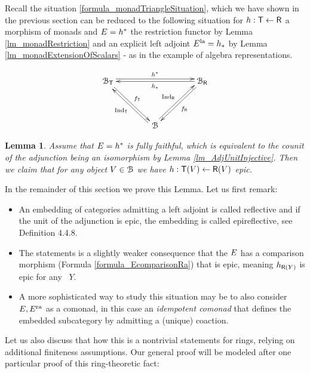 \documentclass[a4paper, reqno]{amsart}
\newtheorem{lemma}[theorem]{Lemma}
\theoremstyle{introTheorems}
\renewcommand{\1}{\mathbbold{1}}
\begin{document}
Recall the situation \eqref{formula_monadTriangleSituation}, which we have shown in the previous section can be reduced to the following situation for $h:{\mathsf{T}}\leftarrow {\mathsf{R}}$ a morphism of monads and $E=h^*$ the restriction functor by Lemma \ref{lm_monadRestriction} and an explicit left adjoint $E^{\mathrm{la}}=h_*$ by  Lemma \ref{lm_monadExtensionOfScalars} - as in the example of algebra representations.

\begin{equation}
\xymatrix@C=4em@R=4em{
\cat_{\monT} 
\ar@<3pt>[rr]^{\fpullback^*}
\ar[rd]^{\forget_\monT}
&&
\cat_{\monR}
\ar[ld]^{\forget_\monR}
\ar[ll]^{\fpullback_*}
\\
&
\catB
\ar@<3pt>[lu]^{\funT}
\ar@<3pt>[ru]^{\funR}
&
\\
} 
\end{equation}


\begin{lemma}\label{lm_monadicNakayamaTrick}
Assume that $E=h^*$ is fully faithful, which is equivalent to the counit of the adjunction being an isomorphism by Lemma \ref{lm_AdjUnitInjective}. Then we claim that for any object $V\in\mathcal{B}$ we have $h:{\mathsf{T}}(V)\leftarrow {\mathsf{R}}(V)$ epic.\end{lemma}

In the remainder of this section we prove this Lemma. Let us first remark:
\begin{itemize}
\item An embedding of categories admitting a left adjoint is called reflective and if the unit of the adjunction is epic, the embedding is called epireflective, see \cite{Riehl16} Definition 4.4.8. 
\item 
The statements is a slightly weaker consequence that the 
$E$ has a comparison morphism (Formula \eqref{formula_EcomparisonRa}) that is epic, meaning $h_{{\mathsf{R}}(Y)}$ is epic for any ~$Y$.
\item A more sophisticated way to study this situation may be to also consider $E,E^{\mathrm{ra}}$ as a comonad, in this case an \emph{idempotent comonad} that defines the embedded subcategory by admitting a (unique) coaction. 
\end{itemize}

Let us also discuss that how this is a nontrivial statements for rings, relying on additional finiteness assumptions. Our general proof will be modeled after one particular proof of this ring-theoretic fact: 
\end{document}
